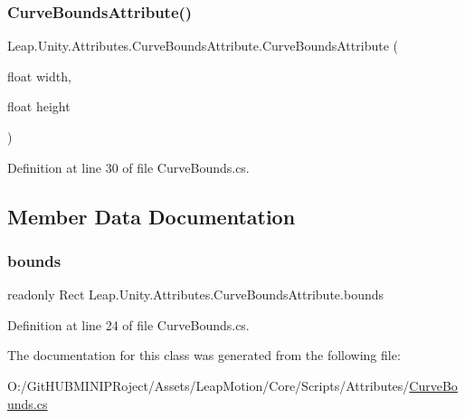 \subsubsection{\texorpdfstring{CurveBoundsAttribute()}{CurveBoundsAttribute()}\hspace{0.1cm}{\footnotesize\ttfamily [2/2]}}
{\footnotesize\ttfamily Leap.\+Unity.\+Attributes.\+Curve\+Bounds\+Attribute.\+Curve\+Bounds\+Attribute (\begin{DoxyParamCaption}\item[{float}]{width,  }\item[{float}]{height }\end{DoxyParamCaption})}



Definition at line 30 of file Curve\+Bounds.\+cs.



\subsection{Member Data Documentation}
\mbox{\label{class_leap_1_1_unity_1_1_attributes_1_1_curve_bounds_attribute_a5e454f6b0a0e4513ffb098ee9ab85a65}} 
\subsubsection{\texorpdfstring{bounds}{bounds}}
{\footnotesize\ttfamily readonly Rect Leap.\+Unity.\+Attributes.\+Curve\+Bounds\+Attribute.\+bounds}



Definition at line 24 of file Curve\+Bounds.\+cs.



The documentation for this class was generated from the following file\+:\begin{DoxyCompactItemize}
\item 
O\+:/\+Git\+H\+U\+B\+M\+I\+N\+I\+P\+Roject/\+Assets/\+Leap\+Motion/\+Core/\+Scripts/\+Attributes/\mbox{\hyperlink{_curve_bounds_8cs}{Curve\+Bounds.\+cs}}\end{DoxyCompactItemize}
